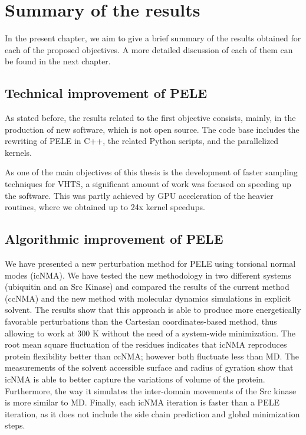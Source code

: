 \chapter{Summary of the results}

In the present chapter, we aim to give a brief summary of the results obtained for each of the proposed objectives. A more detailed discussion of each of them can be found in the next chapter.

\section{Technical improvement of PELE}

As stated before, the results related to the first objective consists, mainly, in the production of new software, which is not open source. The code base includes the rewriting of PELE in C++, the related Python scripts, and the parallelized kernels. 

As one of the main objectives of this thesis is the development of faster sampling techniques for VHTS, a significant amount of work was focused on speeding up the software. This was partly achieved by GPU acceleration of the heavier routines, where we obtained up to 24x kernel speedups. 

\section{Algorithmic improvement of PELE}

We have presented a new perturbation method for PELE using torsional normal modes (icNMA). We have tested the new methodology in two different systems (ubiquitin and an Src Kinase) and compared the results of the current method (ccNMA) and the new method with molecular dynamics simulations in explicit solvent. The results show that this approach is able to produce more energetically favorable perturbations than the Cartesian coordinates-based method, thus allowing to work at 300 K without the need of a system-wide minimization. The root mean square fluctuation of the residues indicates that icNMA reproduces protein flexibility better than ccNMA; however both fluctuate less than MD. The measurements of the solvent accessible surface and radius of gyration show that icNMA is able to better capture the variations of volume of the protein. Furthermore, the way it simulates the inter-domain movements of the Src kinase is more similar to MD. Finally, each icNMA iteration is faster than a PELE iteration, as it does not include the side chain prediction and global minimization steps.

